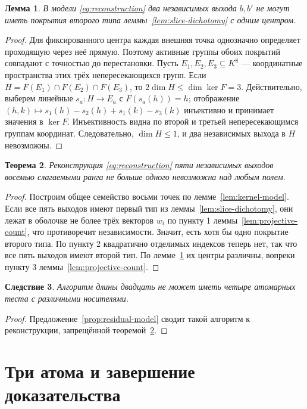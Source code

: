 \documentclass[11pt,a4paper]{article}
\numberwithin{equation}{section}
\theoremstyle{plain}
\newtheorem{theorem}{Теорема}[section]
\newtheorem{lemma}[theorem]{Лемма}
\newtheorem{cor}[theorem]{Следствие}
\theoremstyle{definition}
\newcommand{\leqs}{\leqslant}\newcommand{\geqs}{\geqslant}
\begin{document}
\begin{lemma}\label{lem:same-center}
В модели \eqref{eq:reconstruction} два независимых выхода $b,b'$
не могут иметь покрытия второго типа леммы~\ref{lem:slice-dichotomy}
с одним центром.
\end{lemma}
\begin{proof}
Для фиксированного центра каждая внешняя точка однозначно определяет
проходящую через неё прямую. Поэтому активные группы обоих покрытий
совпадают с точностью до перестановки.
Пусть $E_1,E_2,E_3\subseteq K^8$ --- координатные пространства этих
трёх непересекающихся групп. Если $H=F(E_1)\cap F(E_2)\cap F(E_3)$,
то $2\dim H\leqs\dim\ker F=3$.
Действительно, выберем линейные $s_a:H\to E_a$ с $F(s_a(h))=h$;
отображение
$(h,k)\mapsto s_1(h)-s_2(h)+s_1(k)-s_3(k)$ инъективно
и принимает значения в $\ker F$. Инъективность видна по второй и
третьей непересекающимся группам координат.
Следовательно, $\dim H\leqs1$, и два независимых выхода в $H$ невозможны.
\end{proof}

\begin{theorem}\label{thm:no-eight}
Реконструкция \eqref{eq:reconstruction} пяти независимых выходов
восемью слагаемыми ранга не больше одного невозможна над любым полем.
\end{theorem}
\begin{proof}
Построим общее семейство восьми точек по лемме~\ref{lem:kernel-model}.
Если все пять выходов имеют первый тип из
леммы~\ref{lem:slice-dichotomy}, они лежат в оболочке не более трёх
векторов $w_i$ по пункту 1 леммы~\ref{lem:projective-count},
что противоречит независимости.
Значит, есть хотя бы одно покрытие второго типа. По пункту 2
квадратично отделимых индексов теперь нет, так что все пять выходов
имеют второй тип. По лемме~\ref{lem:same-center} их центры различны,
вопреки пункту 3 леммы~\ref{lem:projective-count}.
\end{proof}

\begin{cor}\label{cor:no-four}
Алгоритм длины двадцать не может иметь четыре атомарных теста
с различными носителями.
\end{cor}
\begin{proof}
Предложение~\ref{prop:residual-model} сводит такой алгоритм к
реконструкции, запрещённой теоремой~\ref{thm:no-eight}.
\end{proof}

\section{Три атома и завершение доказательства}
\end{document}
